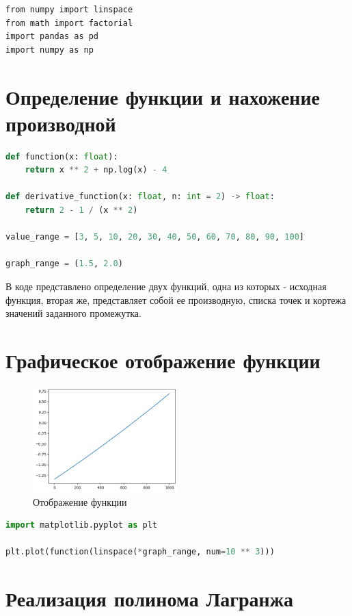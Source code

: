 \documentclass{article}
\begin{document}
\begin{lstlisting}
from numpy import linspace
from math import factorial
import pandas as pd
import numpy as np
\end{lstlisting}

\section{Определение функции и нахожение производной}
\begin{lstlisting}[language=Python]
def function(x: float):
    return x ** 2 + np.log(x) - 4
    
def derivative_function(x: float, n: int = 2) -> float:
    return 2 - 1 / (x ** 2)

value_range = [3, 5, 10, 20, 30, 40, 50, 60, 70, 80, 90, 100]

graph_range = (1.5, 2.0)
\end{lstlisting}

В коде представлено определение двух функций, одна из которых - исходная функция, вторая же, представляет собой ее производную, списка точек и кортежа значений заданного промежутка.

\section{Графическое отображение функции}

\begin{figure}[h]
    \centering
    \includegraphics[width=0.5\textwidth]{output.png}
    \caption{Отображение функции}
    \label{fig:my_label}
\end{figure}

\begin{lstlisting}[language=Python]
import matplotlib.pyplot as plt

plt.plot(function(linspace(*graph_range, num=10 ** 3)))
\end{lstlisting}


\section{Реализация полинома Лагранжа}
\end{document}
